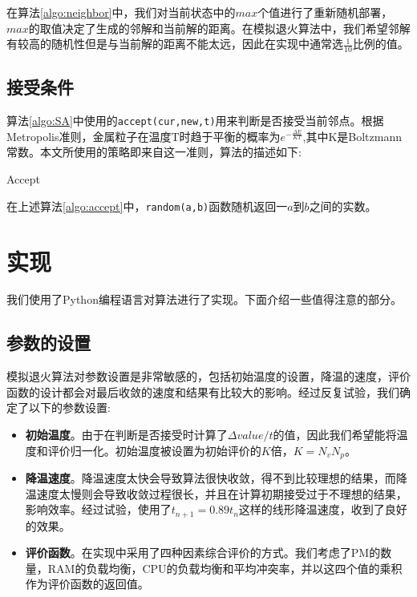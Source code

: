 在算法\ref{algo:neighbor}中，我们对当前状态中的$max$个值进行了重新随机部署，$max$的取值决定了生成的邻解和当前解的距离。在模拟退火算法中，我们希望邻解有较高的随机性但是与当前解的距离不能太远，因此在实现中通常选$\frac{1}{10}$比例的值。

\subsection{接受条件}
\label{sec:accept}
算法\ref{algo:SA}中使用的\texttt{accept(cur,new,t)}用来判断是否接受当前邻点。根据Metropolis准则，金属粒子在温度T时趋于平衡的概率为$e^{-\frac{\Delta E}{KT}}$,其中K是Boltzmann常数。本文所使用的策略即来自这一准则，算法的描述如下:
\begin{algorithm}[H]
  \DontPrintSemicolon
  
  \caption{Accept\label{algo:accept}}
\end{algorithm}
在上述算法\ref{algo:accept}中，\texttt{random(a,b)}函数随机返回一$a$到$b$之间的实数。

\section{实现}
\label{sec:implementation}

我们使用了Python编程语言对算法进行了实现。下面介绍一些值得注意的部分。

\subsection{参数的设置}
\label{sec:config}

模拟退火算法对参数设置是非常敏感的，包括初始温度的设置，降温的速度，评价函数的设计都会对最后收敛的速度和结果有比较大的影响。经过反复试验，我们确定了以下的参数设置:

\begin{itemize}
\item \textbf{初始温度}。由于在判断是否接受时计算了$\Delta value/t$的值，因此我们希望能将温度和评价归一化。初始温度被设置为初始评价的$K$倍，$K = N_v N_p$。
\item \textbf{降温速度}。降温速度太快会导致算法很快收敛，得不到比较理想的结果，而降温速度太慢则会导致收敛过程很长，并且在计算初期接受过于不理想的结果，影响效率。经过试验，使用了$t_{n+1} = 0.89t_n$这样的线形降温速度，收到了良好的效果。
\item \textbf{评价函数}。在实现中采用了四种因素综合评价的方式。我们考虑了PM的数量，RAM的负载均衡，CPU的负载均衡和平均冲突率，并以这四个值的乘积作为评价函数的返回值。\label{evalutation}
\end{itemize}

